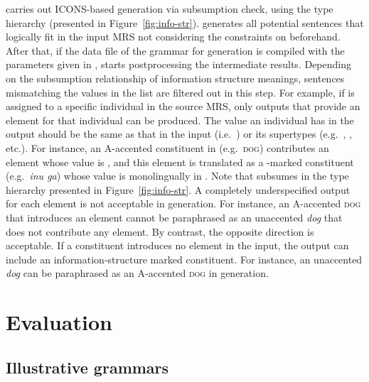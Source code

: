 \isi{\ace} carries out ICONS-based generation via subsumption check,
using the type hierarchy  (presented in
Figure~\ref{fig:info-str}). \isi{\ace} generates
all potential sentences that logically fit in the input MRS not
considering the constraints on  beforehand. After that, if
the data file of the grammar for generation is compiled with the
parameters given in , \isi{\ace} starts
postprocessing the intermediate results.  Depending on the subsumption
relationship of information structure meanings, sentences mismatching
the values in the  list are filtered out in this step.  For
example, if  is assigned to a specific individual
in the source MRS, only outputs that provide an 
element for that individual can be produced. The
 value an individual has in the output should be the
same as that in the input (i.e.\ ) or its supertypes (e.g.\ , ,
etc.). For instance, an A-accented constituent in 
(e.g.\ \textsc{dog}) contributes an  element whose value is
, and this element is translated as a \ga-marked
constituent (e.g.\ \textit{inu ga}) whose value is monolingually
 in . Note that  subsumes
 in the type hierarchy presented in
Figure~\ref{fig:info-str}. A completely
underspecified output for each  element is not acceptable
in generation. For instance, an A-accented
\textsc{dog} that introduces an  element cannot be
paraphrased as an unaccented \textit{dog} that does not contribute any
 element. By contrast, the opposite direction
is acceptable.  If a constituent introduces no  element in
the input, the output can include an information-structure marked
constituent. For instance, an unaccented \textit{dog} can be
paraphrased as an A-accented \textsc{dog} in generation.






\section{Evaluation}
\label{13:sec:evaluation}


\subsection{Illustrative grammars}
\label{13:ssec:grammars}

